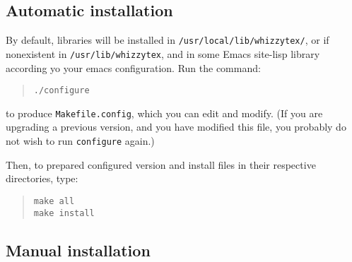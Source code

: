 \documentclass{article}
\let \lst \verb
\begin{document}
\subsection {Automatic installation}

By default, libraries will be installed in
\lst"/usr/local/lib/whizzytex/", or if nonexistent in
\lst"/usr/lib/whizzytex", and in some  Emacs site-lisp library 
according yo your emacs configuration. Run the command:
\begin{quote}
\begin{verbatim}
./configure
\end{verbatim}
\end{quote}
to produce \lst"Makefile.config", which you can edit and modify. 
(If you are upgrading a previous version, 
and you have modified this file, you probably do not wish to run 
{\tt configure} again.)

Then, to prepared configured version and install files in their respective
directories, type: 
\begin{quote}
\begin{verbatim}
make all
make install
\end{verbatim}
\end{quote}

\subsection {Manual installation}
\end{document}
